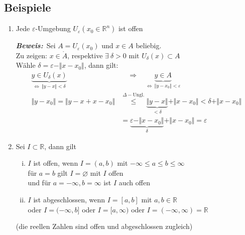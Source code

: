 \documentclass[11pt,a4paper]{book}
\newcommand {\R}	{\mathbb{R}}
\newcommand {\Rn}	{\mathbb{R}^n}
\newcommand{\1}    	{\mathbbm{1}}
\newcommand{\mitt}	{\textrm{ mit }}
\newcommand{\Beweis}[1][Beweis]
{\begin{mdframed}[backgroundcolor=gray!10,linewidth=0pt]\noindent\textit{\textbf{{#1}:}}~}
\newcommand{\QED}	{\end{mdframed}}
\begin{document}
\subsection{Beispiele}
\begin{enumerate}[1.~]
	\item Jede \(\varepsilon\)-Umgebung \(U_\varepsilon(x_0 \in \Rn)\) ist offen
	\Beweis Sei \(A = U_\varepsilon(x_0)\) und \(x \in A\) beliebig.\\
	Zu zeigen: \(x \in \mathring{A}\), respektive \(\exists~ \delta > 0 \mitt U_\delta(x) \subset A\)\\
	Wähle \(\delta = \varepsilon - \Vert x - x_0 \Vert\), dann gilt:
	\begin{align*}
		\underbrace{y \in U_\delta(x)}_{\Leftrightarrow~\Vert y - x \Vert < \delta}
		&\quad\Rightarrow\quad
		\underbrace{y \in A}_{\Leftrightarrow~\Vert y - x_0 \Vert < \varepsilon} \\
		\Vert y - x_0 \Vert =
		\Vert y - x + x - x_0 \Vert &\stackrel{\Delta-\textrm{Ungl.}}{\leqslant}
		\underbrace{\Vert y - x \Vert}_{< \delta} + \Vert x - x_0 \Vert < \delta + \Vert x - x_0 \Vert\\
		&= \underbrace{\varepsilon - \Vert x - x_0 \Vert}_{\delta} + \Vert x - x_0 \Vert = \varepsilon
	\end{align*}
	\QED
	\item Sei \(I \subset \R\), dann gilt
	\begin{enumerate}[(i)]
		\item \(I\) ist offen, wenn \(I = (a,b)\) mit \( -\infty \leqslant a \leqslant b \leqslant \infty \) \\
		für \(a = b\) gilt \(I = \varnothing\) mit \(I\) offen \\
		und für \(a = -\infty, b = \infty\) ist \(I\) auch offen
		\item \(I\) ist abgeschlossen, wenn \(I = [a,b]\) mit \(a,b \in \R\) \\
		oder \(I = (-\infty, b]\) oder \(I = [a, \infty) \) oder \(I = (-\infty, \infty) = \R\)
	\end{enumerate}
	(die reellen Zahlen sind offen und abgeschlossen zugleich)
\end{enumerate}
\end{document}
